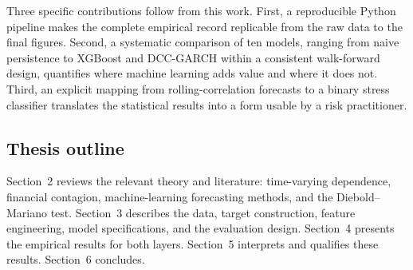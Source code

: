 Three specific contributions follow from this work. First, a reproducible Python pipeline makes the complete empirical record replicable from the raw data to the final figures. Second, a systematic comparison of ten models, ranging from naive persistence to XGBoost and DCC-GARCH within a consistent walk-forward design, quantifies where machine learning adds value and where it does not. Third, an explicit mapping from rolling-correlation forecasts to a binary stress classifier translates the statistical results into a form usable by a risk practitioner.

\subsection{Thesis outline}

Section~2 reviews the relevant theory and literature: time-varying dependence, financial contagion, machine-learning forecasting methods, and the Diebold--Mariano test. Section~3 describes the data, target construction, feature engineering, model specifications, and the evaluation design. Section~4 presents the empirical results for both layers. Section~5 interprets and qualifies these results. Section~6 concludes.
